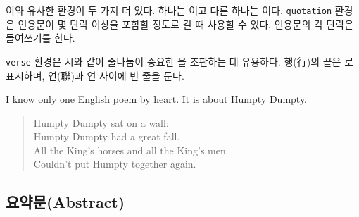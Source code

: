 이와 유사한 환경이 두 가지 더 있다. 하나는 이고 다른 하나는 이다.
\texttt{quotation} 환경은 인용문이 몇 단락 이상을 포함할 정도로 길 때 사용할 수 있다. 인용문의
각 단락은 들여쓰기를 한다.

\texttt{verse} 환경은 시와 같이 줄나눔이 중요한 을 조판하는 데 유용하다.
행(行)의 끝은 \ci{\bs}로 표시하며, 연(聯)과 연 사이에 빈 줄을 둔다.


\begin{example}
I know only one English poem by
heart. It is about Humpty Dumpty.
\begin{flushleft}
\begin{verse}
Humpty Dumpty sat on a wall:\\
Humpty Dumpty had a great fall.\\
All the King's horses and all
the King's men\\
Couldn't put Humpty together
again.
\end{verse}
\end{flushleft}
\end{example}

\subsection{요약문(Abstract)}

